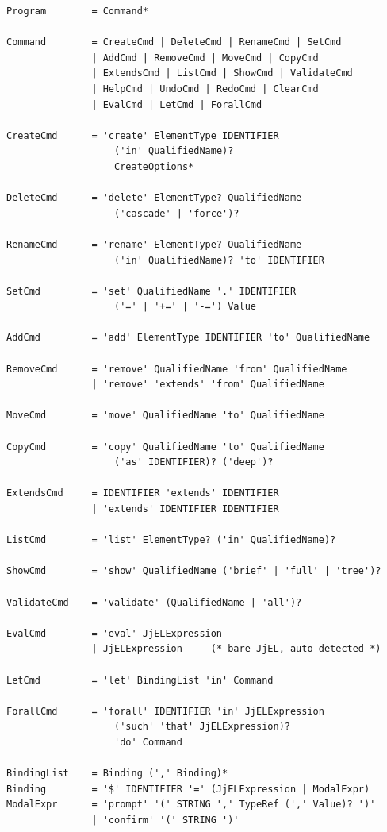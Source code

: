 \documentclass[11pt,a4paper]{article}
\begin{document}
\begin{lstlisting}[style=grammar,caption={JjScript formal grammar in EBNF}]
Program        = Command*

Command        = CreateCmd | DeleteCmd | RenameCmd | SetCmd
               | AddCmd | RemoveCmd | MoveCmd | CopyCmd
               | ExtendsCmd | ListCmd | ShowCmd | ValidateCmd
               | HelpCmd | UndoCmd | RedoCmd | ClearCmd
               | EvalCmd | LetCmd | ForallCmd

CreateCmd      = 'create' ElementType IDENTIFIER
                   ('in' QualifiedName)?
                   CreateOptions*

DeleteCmd      = 'delete' ElementType? QualifiedName
                   ('cascade' | 'force')?

RenameCmd      = 'rename' ElementType? QualifiedName
                   ('in' QualifiedName)? 'to' IDENTIFIER

SetCmd         = 'set' QualifiedName '.' IDENTIFIER
                   ('=' | '+=' | '-=') Value

AddCmd         = 'add' ElementType IDENTIFIER 'to' QualifiedName

RemoveCmd      = 'remove' QualifiedName 'from' QualifiedName
               | 'remove' 'extends' 'from' QualifiedName

MoveCmd        = 'move' QualifiedName 'to' QualifiedName

CopyCmd        = 'copy' QualifiedName 'to' QualifiedName
                   ('as' IDENTIFIER)? ('deep')?

ExtendsCmd     = IDENTIFIER 'extends' IDENTIFIER
               | 'extends' IDENTIFIER IDENTIFIER

ListCmd        = 'list' ElementType? ('in' QualifiedName)?

ShowCmd        = 'show' QualifiedName ('brief' | 'full' | 'tree')?

ValidateCmd    = 'validate' (QualifiedName | 'all')?

EvalCmd        = 'eval' JjELExpression
               | JjELExpression     (* bare JjEL, auto-detected *)

LetCmd         = 'let' BindingList 'in' Command

ForallCmd      = 'forall' IDENTIFIER 'in' JjELExpression
                   ('such' 'that' JjELExpression)?
                   'do' Command

BindingList    = Binding (',' Binding)*
Binding        = '$' IDENTIFIER '=' (JjELExpression | ModalExpr)
ModalExpr      = 'prompt' '(' STRING ',' TypeRef (',' Value)? ')'
               | 'confirm' '(' STRING ')'


\end{lstlisting}
\end{document}
